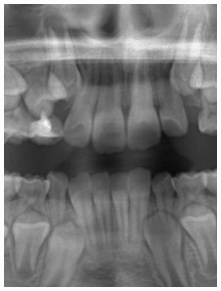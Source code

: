 \documentclass[a4paper,titlepage,12pt]{article}
\begin{document}
\begin{figure}
  \centering
	\begin{minipage}[b]{0.23\linewidth}
		\includegraphics[width=\linewidth]{preprocess/original.png}
	\end{minipage}
	\begin{minipage}[b]{0.23\linewidth}

\end{minipage}
\end{figure}
\end{document}
